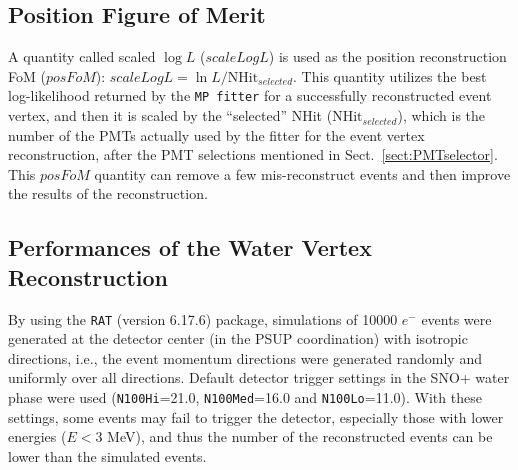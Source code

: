 \subsection{Position Figure of Merit}\label{sect:positionFoM}
A quantity called scaled $\log L$ ($scaleLogL$) is used as the position reconstruction FoM ($posFoM$): $scaleLogL = \ln L/\mathrm{NHit}_{selected}$. This quantity utilizes the best log-likelihood returned by the \texttt{MP fitter} for a successfully reconstructed event vertex, and then it is scaled by the ``selected'' NHit ($\mathrm{NHit}_{selected}$), which is the number of the PMTs actually used by the fitter for the event vertex reconstruction, after the PMT selections mentioned in Sect.~\ref{sect:PMTselector}. This $posFoM$ quantity can remove a few mis-reconstruct events and then improve the results of the reconstruction.

\subsection{Performances of the Water Vertex Reconstruction}\label{sect:waterFitterVertex}

By using the \texttt{RAT} (version 6.17.6) package, simulations of 10000 $e^-$ events were generated at the detector center (in the PSUP coordination) with isotropic directions, i.e., the event momentum directions were generated randomly and uniformly over all directions. Default detector trigger settings in the SNO+ water phase were used (\texttt{N100Hi}=21.0, \texttt{N100Med}=16.0 and \texttt{N100Lo}=11.0). With these settings, some events may fail to trigger the detector, especially those with lower energies ($E<3$ MeV), and thus the number of the reconstructed events can be lower than the simulated events.

